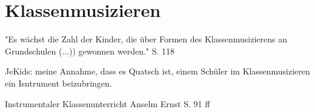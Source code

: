 \section{Klassenmusizieren}


"Es wächst die Zahl der Kinder, die über Formen des Klassenmusizierens an
Grundschulen (...)) gewonnen werden." S. 118 

JeKids: meine Annahme, dass es Quatsch ist, einem Schüler im Klassenmusizieren
ein Isntrument beizubringen.

Instrumentaler Klassenunterricht
Anselm Ernst S. 91 ff
